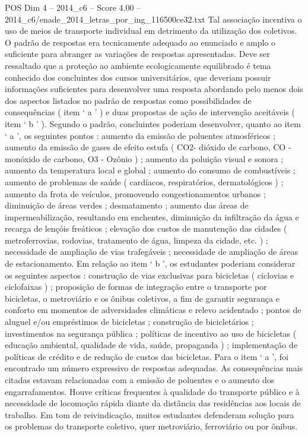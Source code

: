 \begin{textsample}{POS Dim 4 – 2014\_c6 – Score 4.00 – 2014\_c6/enade\_2014\_letras\_por\_ing\_116500ce32.txt}
Tal associação incentiva o uso de meios de transporte individual em detrimento da utilização dos coletivos.
O padrão de respostas era tecnicamente adequado ao enunciado e amplo o suficiente para abranger as variações de respostas apresentadas.
Deve ser ressaltado que a proteção ao ambiente ecologicamente equilibrado é tema conhecido dos concluintes dos cursos universitários, que deveriam possuir informações suficientes para desenvolver uma resposta abordando pelo menos dois dos aspectos listados no padrão de respostas como possibilidades de consequências ( item ‘ a ’ ) e duas propostas de ação de intervenção aceitáveis ( item ‘ b ’ ).
Segundo o padrão, concluintes poderiam desenvolver, quanto ao item ‘ a ’, os seguintes pontos : aumento da emissão de poluentes atmosféricos ; aumento da emissão de gases de efeito estufa ( CO2- dióxido de carbono, CO - monóxido de carbono, O3 - Ozônio ) ; aumento da poluição visual e sonora ; aumento da temperatura local e global ; aumento do consumo de combustíveis ; aumento de problemas de saúde ( cardíacos, respiratórios, dermatológicos ) ; aumento da frota de veículos, promovendo congestionamentos urbanos ; diminuição de áreas verdes ; desmatamento ; aumento das áreas de impermeabilização, resultando em enchentes, diminuição da infiltração da água e recarga de lençóis freáticos ; elevação dos custos de manutenção das cidades ( metroferrovias, rodovias, tratamento de água, limpeza da cidade, etc. ) ; necessidade de ampliação de vias trafegáveis ; necessidade de ampliação de áreas de estacionamento.
Em relação ao item ‘ b ’, os estudantes poderiam considerar os seguintes aspectos : construção de vias exclusivas para bicicletas ( ciclovias e ciclofaixas ) ; proposição de formas de integração entre o transporte por bicicletas, o metroviário e os ônibus coletivos, a fim de garantir segurança e conforto em momentos de adversidades climáticas e relevo acidentado ; pontos de aluguel e/ou empréstimos de bicicletas ; construção de bicicletários ; investimentos na segurança pública ; políticas de incentivo ao uso de bicicletas ( educação ambiental, qualidade de vida, saúde, propaganda ) ; implementação de políticas de crédito e de redução de custos das bicicletas.
Para o item ‘ a ’, foi encontrado um número expressivo de respostas adequadas.
As consequências mais citadas estavam relacionadas com a emissão de poluentes e o aumento dos engarrafamentos.
Houve críticas frequentes à qualidade do transporte público e à necessidade de locomoção rápida diante da distância das residências aos locais de trabalho.
Em tom de reivindicação, muitos estudantes defenderam solução para os problemas do transporte coletivo, quer metroviário, ferroviário ou por ônibus.

\end{textsample}
